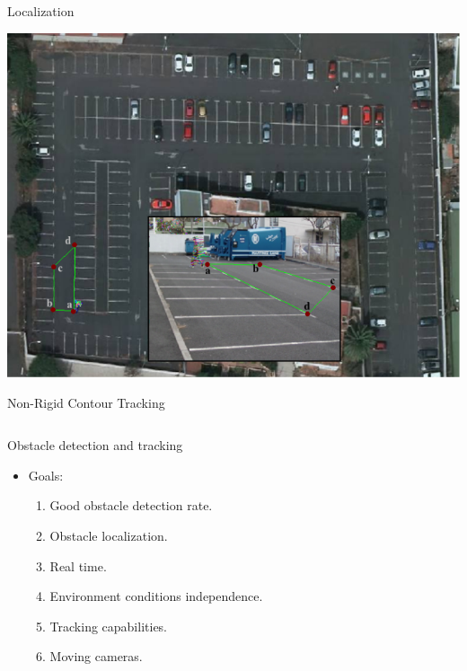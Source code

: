 \begin{frame}{Localization}
  \begin{center}
    \includegraphics[width=\textwidth]{localization}
  \end{center}
\end{frame}

\begin{frame}{Non-Rigid Contour Tracking}
  \begin{columns}[c] %
  \end{columns}
\end{frame}

\begin{frame}{Obstacle detection and tracking}
  \begin{itemize}
  \item Goals:
    \begin{enumerate}
      \item Good obstacle detection rate. 
      \item Obstacle localization. 
      \item Real time. 
      \item Environment conditions independence. 
      \item Tracking capabilities. 
      \item Moving cameras. 
    \end{enumerate}
  \end{itemize}
\end{frame}